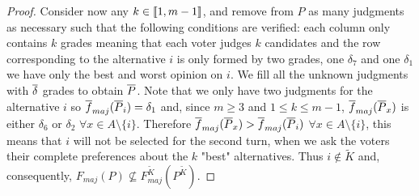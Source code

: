\begin{proof}
	Consider now any $k \in \llbracket1,m-1\rrbracket$, and remove from $P$ as many judgments as necessary such that the following conditions are verified: each column only contains $k$ grades \textemdash meaning that each voter judges $k$ candidates \textemdash and the row corresponding to the alternative $i$ is only formed by two grades, one $\delta_7$ and one $\delta_1$ \textemdash we have only the best and worst opinion on $i$. We fill all the unknown judgments with $\overline{\delta}$ grades to obtain $\overline{P}$. Note that we only have two judgments for the alternative $i$ so $\overline{f}_{maj}(\overline{P}_i)=\delta_1$ and, since $m\geq3$ and $1 \leq k \leq m-1$, $\overline{f}_{maj}(\overline{P}_x)$ is either $\delta_6$ or $\delta_2$ $\forall x \in A \setminus \{i\}$. Therefore $\overline{f}_{maj}(\overline{P}_x) > \overline{f}_{maj}(\overline{P}_i)$ $\forall x \in A \setminus \{i\}$, this means that $i$ will not be selected for the second turn, when we ask the voters their complete preferences about the $k$ "best" alternatives. Thus $i \notin \tilde{K}$ and, consequently, $F_{maj}(P) \nsubseteq F^{\tilde{K}}_{maj}(P^{\tilde{K}})$.
\end{proof}


